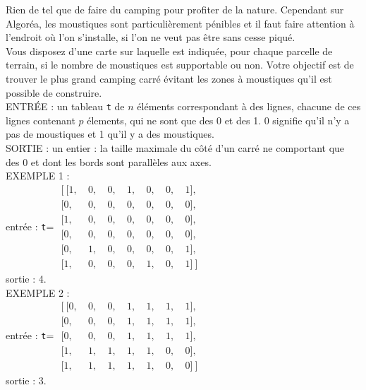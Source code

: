 Rien de tel que de faire du camping pour profiter de la nature. Cependant sur Algoréa, les 
moustiques sont particulièrement pénibles et il faut faire attention à l'endroit où l'on s'installe, 
si l'on ne veut pas être sans cesse piqué.\\

Vous disposez d'une carte sur laquelle est indiquée, pour chaque parcelle de terrain, si le nombre 
de moustiques est supportable ou non. Votre objectif est de trouver le plus grand camping carré 
évitant les zones à moustiques qu'il est possible de construire.\\

\noindent ENTRÉE :  un tableau \texttt{t} de $n$ éléments correspondant à des lignes, chacune de 
ces lignes contenant $p$ élements, qui ne sont que des 0 et des 1. 0 signifie qu'il n'y a pas de 
moustiques et 1 qu'il y a des moustiques.\\
SORTIE : un entier : la taille maximale du côté d'un carré ne comportant que des 0 et dont les 
bords sont parallèles aux axes.\\

\noindent EXEMPLE 1 :\\
entrée : \texttt{t}= $\begin{matrix}[\  [1,\ &0,\ &0,\ &1,\ &0,\ &0,\ &1],\\
                          [0,\ &0,\ &0,\ &0,\ &0,\ &0,\ &0],\\
                          [1,\ &0,\ &0,\ &0,\ &0,\ &0,\ &0],\\
                          [0,\ &0,\ &0,\ &0,\ &0,\ &0,\ &0],\\
                          [0,\ &1,\ &0,\ &0,\ &0,\ &0,\ &1],\\
                          [1,\ &0,\ &0,\ &0,\ &1,\ &0,\ &1]\ ]
                         \end{matrix}$\\
sortie : 4.\\

\noindent EXEMPLE 2 :\\
entrée : \texttt{t}= $\begin{matrix}[\  [0,\ &0,\ &0,\ &1,\ &1,\ &1,\ &1],\\
                          [0,\ &0,\ &0,\ &1,\ &1,\ &1,\ &1],\\
                          [0,\ &0,\ &0,\ &1,\ &1,\ &1,\ &1],\\
                          [1,\ &1,\ &1,\ &1,\ &1,\ &0,\ &0],\\
                          [1,\ &1,\ &1,\ &1,\ &1,\ &0,\ &0]\ ]
                         \end{matrix}$\\
sortie : 3.